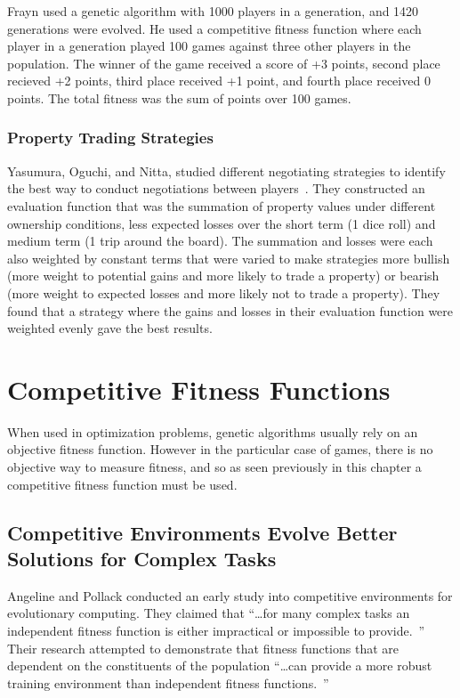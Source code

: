 Frayn used a genetic algorithm with 1000 players in a generation, and
1420 generations were evolved. He used a competitive fitness function where each
player in a generation played 100 games against three other players in the
population. The winner of the game received a score of +3 points, second place
recieved +2 points, third place received +1 point, and fourth place received 0
points. The total fitness was the sum of points over 100 games.

\subsubsection{Property Trading Strategies} \label{3_trading}

Yasumura, Oguchi, and Nitta, studied different negotiating strategies to
identify the best way to conduct negotiations between
players~\cite{Yasumura2001Negotiate}. They constructed an evaluation function
that was the summation of property values under different ownership conditions,
less expected losses over the short term (1 dice roll) and medium term (1 trip
around the board). The summation and losses were each also weighted by constant
terms that were varied to make strategies more bullish (more weight to potential
gains and more likely to trade a property) or bearish (more weight to expected
losses and more likely not to trade a property). They found that a strategy
where the gains and losses in their evaluation function were weighted evenly
gave the best results.

\section{Competitive Fitness Functions}

When used in optimization problems, genetic algorithms usually rely on an
objective fitness function. However in the particular case of games, there is no
objective way to measure fitness, and so as seen previously in this chapter a
competitive fitness function must be used.

\subsection{Competitive Environments Evolve Better Solutions for Complex Tasks}

Angeline and Pollack conducted an early study into competitive environments for
evolutionary computing. They claimed that ``\ldots for many complex tasks an
independent fitness function is either impractical or impossible to
provide.~\cite{Angeline:1993:CEE:645513.657590}'' Their research attempted to
demonstrate that fitness functions that are dependent on the constituents of the
population ``\ldots can provide a more robust training environment than
independent fitness functions.~\cite{Angeline:1993:CEE:645513.657590}''

